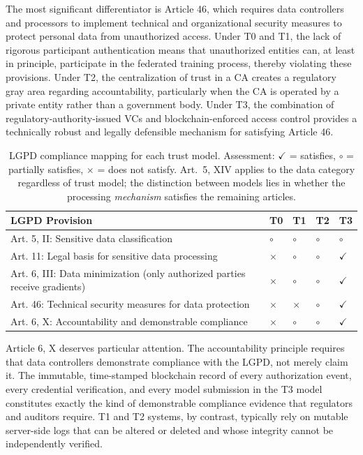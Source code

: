 \documentclass{sbc2023}
\begin{document}
The most significant differentiator is Article 46, which requires data controllers and processors to implement technical and organizational security measures to protect personal data from unauthorized access. Under T0 and T1, the lack of rigorous participant authentication means that unauthorized entities can, at least in principle, participate in the federated training process, thereby violating these provisions. Under T2, the centralization of trust in a CA creates a regulatory gray area regarding accountability, particularly when the CA is operated by a private entity rather than a government body. Under T3, the combination of regulatory-authority-issued VCs and blockchain-enforced access control provides a technically robust and legally defensible mechanism for satisfying Article 46.

\begin{table}[!ht]
\caption{LGPD compliance mapping for each trust model. Assessment: $\checkmark$ = satisfies, $\circ$ = partially satisfies, $\times$ = does not satisfy. Art.~5, XIV applies to the data category regardless of trust model; the distinction between models lies in whether the processing \textit{mechanism} satisfies the remaining articles.}
\label{tab:lgpd}
\centering
\begin{tabularx}{\textwidth}{lXXXX}
\toprule
\textbf{LGPD Provision} & \textbf{T0} & \textbf{T1} & \textbf{T2} & \textbf{T3} \\
\midrule
Art. 5, II: Sensitive data classification & $\circ$ & $\circ$ & $\circ$ & $\circ$ \\
Art. 11: Legal basis for sensitive data processing & $\times$ & $\circ$ & $\circ$ & $\checkmark$ \\
Art. 6, III: Data minimization (only authorized parties receive gradients) & $\times$ & $\circ$ & $\circ$ & $\checkmark$ \\
Art. 46: Technical security measures for data protection & $\times$ & $\times$ & $\circ$ & $\checkmark$ \\
Art. 6, X: Accountability and demonstrable compliance & $\times$ & $\circ$ & $\circ$ & $\checkmark$ \\
\bottomrule
\end{tabularx}
\end{table}

Article 6, X deserves particular attention. The accountability principle requires that data controllers demonstrate compliance with the LGPD, not merely claim it. The immutable, time-stamped blockchain record of every authorization event, every credential verification, and every model submission in the T3 model constitutes exactly the kind of demonstrable compliance evidence that regulators and auditors require. T1 and T2 systems, by contrast, typically rely on mutable server-side logs that can be altered or deleted and whose integrity cannot be independently verified.
\end{document}
